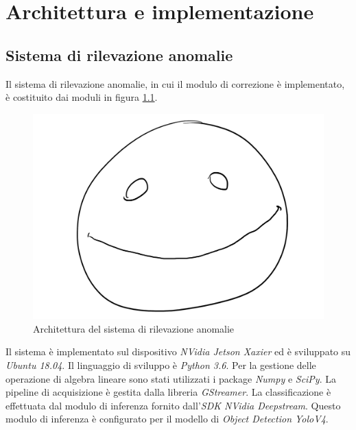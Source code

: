 \chapter{Architettura e implementazione}
\label{sec:implementazione}



\section{Sistema di rilevazione anomalie}
Il sistema di rilevazione anomalie, in cui il modulo di correzione è implementato, è costituito dai moduli in figura \ref{fig:sys modules}.
\begin{figure}
    \caption{Architettura del sistema di rilevazione anomalie}
    \label{fig:sys modules}
    \centering
    \includegraphics[width=.66\textwidth]{images/placeholder.png}
\end{figure}
Il sistema è implementato sul dispositivo \emph{NVidia Jetson Xaxier}\cite{arch:jetson} ed è sviluppato su \emph{Ubuntu 18.04}\cite{arch:ubuntu}.
Il linguaggio di sviluppo è \emph{Python 3.6}\cite{arch:python}.
Per la gestione delle operazione di algebra lineare sono stati utilizzati i package \emph{Numpy}\cite{arch:numpy} e \emph{SciPy}\cite{arch:scipy}.
La pipeline di acquisizione è gestita dalla libreria \emph{GStreamer}\cite{arch:gstreamer}.
La classificazione è effettuata dal modulo di inferenza fornito dall'\emph{SDK NVidia Deepstream}\cite{arch:deepstream}.
Questo modulo di inferenza è configurato per il modello di \emph{Object Detection YoloV4}\cite{arch:yolo}.

